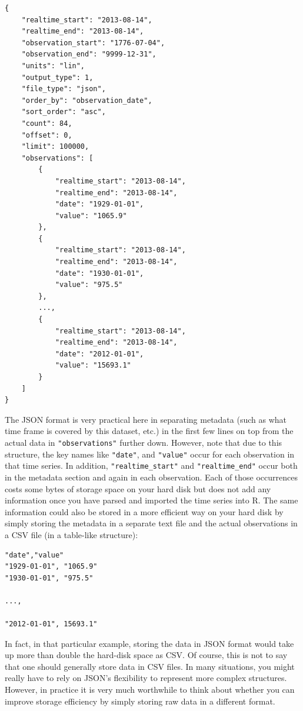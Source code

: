 \documentclass[
  12pt,
]{style/krantz}
\begin{document}
\begin{verbatim}
{
    "realtime_start": "2013-08-14",
    "realtime_end": "2013-08-14",
    "observation_start": "1776-07-04",
    "observation_end": "9999-12-31",
    "units": "lin",
    "output_type": 1,
    "file_type": "json",
    "order_by": "observation_date",
    "sort_order": "asc",
    "count": 84,
    "offset": 0,
    "limit": 100000,
    "observations": [
        {
            "realtime_start": "2013-08-14",
            "realtime_end": "2013-08-14",
            "date": "1929-01-01",
            "value": "1065.9"
        },
        {
            "realtime_start": "2013-08-14",
            "realtime_end": "2013-08-14",
            "date": "1930-01-01",
            "value": "975.5"
        },
        ...,
        {
            "realtime_start": "2013-08-14",
            "realtime_end": "2013-08-14",
            "date": "2012-01-01",
            "value": "15693.1"
        }
    ]
}
\end{verbatim}

The JSON format is very practical here in separating metadata (such as what time frame is covered by this dataset, etc.) in the first few lines on top from the actual data in \texttt{"observations"} further down. However, note that due to this structure, the key names like \texttt{"date"}, and \texttt{"value"} occur for each observation in that time series. In addition, \texttt{"realtime\_start"} and \texttt{"realtime\_end"} occur both in the metadata section and again in each observation. Each of those occurrences costs some bytes of storage space on your hard disk but does not add any information once you have parsed and imported the time series into R. The same information could also be stored in a more efficient way on your hard disk by simply storing the metadata in a separate text file and the actual observations in a CSV file (in a table-like structure):

\begin{verbatim}
"date","value"
"1929-01-01", "1065.9"
"1930-01-01", "975.5"

...,

"2012-01-01", 15693.1"
\end{verbatim}

In fact, in that particular example, storing the data in JSON format would take up more than double the hard-disk space as CSV. Of course, this is not to say that one should generally store data in CSV files. In many situations, you might really have to rely on JSON's flexibility to represent more complex structures. However, in practice it is very much worthwhile to think about whether you can improve storage efficiency by simply storing raw data in a different format.
\end{document}
